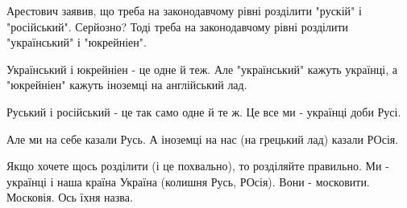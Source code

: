 Арестович заявив, що треба на законодавчому рівні розділити "рускій" і
"російський". Серйозно? Тоді треба на законодавчому рівні розділити
"український" і "юкрейніен". 

Український і юкрейніен - це одне й теж. Але "український" кажуть українці, а
"юкрейніен" кажуть іноземці на англійський лад. 

Руський і російський - це так само одне й те ж. Це все ми - українці доби Русі.

Але ми на себе казали Русь. А іноземці на нас (на грецький лад) казали РОсія. 

Якщо хочете щось розділити (і це похвально), то розділяйте правильно. Ми -
українці і наша країна Україна (колишня Русь, РОсія). Вони - московити.
Московія. Ось їхня назва.


